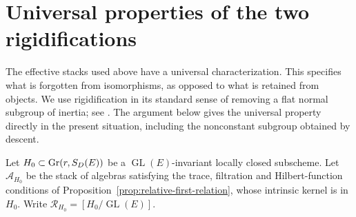 \documentclass[11pt,reqno]{amsart}
\numberwithin{equation}{section}
\theoremstyle{definition}\newtheorem{definition}[theorem]{Definition}
\theoremstyle{remark}\newtheorem{remark}[theorem]{Remark}
\begin{document}

\section{Universal properties of the two rigidifications}
\label{sec:rigidification-v151}

The effective stacks used above have a universal characterization.
This specifies what is forgotten from isomorphisms, as opposed to what
is retained from objects.  We use rigidification in its standard sense
of removing a flat normal subgroup of inertia; see
\cite[Tag~04V2]{StacksRigidV151}.  The argument below gives the
universal property directly in the present situation, including the
nonconstant subgroup obtained by descent.

Let \(H_0\subset\operatorname{Gr}(r,S_D(E))\) be a
\(\operatorname{GL}(E)\)-invariant locally closed subscheme.  Let
\(\mathscr A_{H_0}\) be the stack of algebras satisfying the trace,
filtration and Hilbert-function conditions of
Proposition~\ref{prop:relative-first-relation}, whose intrinsic
kernel is in \(H_0\).  Write
\(\mathscr R_{H_0}=[H_0/\operatorname{GL}(E)]\).
\end{document}
